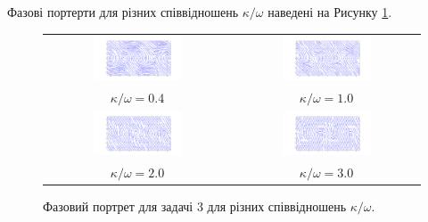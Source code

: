\documentclass[oneside,solution]{tmpl}
\begin{document}
Фазові портерти для різних співвідношень $\kappa/\omega$ наведені на Рисунку \ref{fig:with_friction}.

\begin{figure}
\begin{tabular}{cc}
  \includegraphics[width=0.5\textwidth]{images/hw_5/with_friction_0.4.png} &   \includegraphics[width=0.5\textwidth]{images/hw_5/with_friction_1.png} \\
  $\kappa/\omega = 0.4$ & $\kappa/\omega = 1.0$ \\
  \includegraphics[width=0.5\textwidth]{images/hw_5/with_friction_2.png} &   \includegraphics[width=0.5\textwidth]{images/hw_5/with_friction_3.png} \\
  $\kappa/\omega = 2.0$ & $\kappa/\omega = 3.0$
\end{tabular}
    \caption{Фазовий портрет для задачі 3 для різних співвідношень $\kappa/\omega$.}
    \label{fig:with_friction}
\end{figure}
\end{document}
